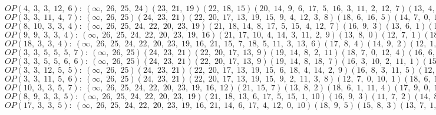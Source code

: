 $OP(4, \;3, \;3, \;12, \;6): \:(\infty, \;26, \;25, \;24)(23, \;21, \;19)(22, \;18, \;15)(20, \;14, \;9, \;6, \;17, \;5, \;16, \;3, \;11, \;2, \;12, \;7)(13, \;4, \;10, \;0, \;8, \;1)$\\
$OP(3, \;3, \;11, \;4, \;7): \:(\infty, \;26, \;25)(24, \;23, \;21)(22, \;20, \;17, \;13, \;19, \;15, \;9, \;4, \;12, \;3, \;8)(18, \;6, \;16, \;5)(14, \;7, \;0, \;11, \;1, \;10, \;2)$\\
$OP(8, \;10, \;3, \;3, \;4): \:(\infty, \;26, \;25, \;24, \;22, \;20, \;23, \;19)(21, \;18, \;14, \;8, \;17, \;5, \;15, \;4, \;12, \;7)(16, \;9, \;3)(13, \;6, \;1)(11, \;2, \;10, \;0)$\\
$OP(9, \;9, \;3, \;3, \;4): \:(\infty, \;26, \;25, \;24, \;22, \;20, \;23, \;19, \;16)(21, \;17, \;10, \;4, \;14, \;3, \;11, \;2, \;9)(13, \;8, \;0)(12, \;7, \;1)(18, \;6, \;15, \;5)$\\
$OP(18, \;3, \;3, \;4): \:(\infty, \;26, \;25, \;24, \;22, \;20, \;23, \;19, \;16, \;21, \;15, \;7, \;18, \;5, \;11, \;3, \;13, \;6)(17, \;8, \;4)(14, \;9, \;2)(12, \;1, \;10, \;0)$\\
$OP(3, \;3, \;5, \;5, \;5, \;7): \:(\infty, \;26, \;25)(24, \;23, \;21)(22, \;20, \;17, \;13, \;9)(19, \;14, \;8, \;2, \;11)(18, \;7, \;0, \;12, \;4)(16, \;6, \;1, \;10, \;3, \;15, \;5)$\\
$OP(3, \;3, \;5, \;5, \;6, \;6): \:(\infty, \;26, \;25)(24, \;23, \;21)(22, \;20, \;17, \;13, \;9)(19, \;14, \;8, \;18, \;7)(16, \;3, \;10, \;2, \;11, \;1)(15, \;6, \;0, \;5, \;12, \;4)$\\
$OP(3, \;3, \;12, \;5, \;5): \:(\infty, \;26, \;25)(24, \;23, \;21)(22, \;20, \;17, \;13, \;19, \;15, \;6, \;18, \;4, \;14, \;2, \;9)(16, \;8, \;3, \;11, \;5)(12, \;7, \;0, \;10, \;1)$\\
$OP(3, \;3, \;11, \;5, \;6): \:(\infty, \;26, \;25)(24, \;23, \;21)(22, \;20, \;17, \;13, \;19, \;15, \;9, \;2, \;11, \;3, \;8)(12, \;7, \;0, \;10, \;1)(18, \;6, \;14, \;4, \;16, \;5)$\\
$OP(10, \;3, \;3, \;5, \;7): \:(\infty, \;26, \;25, \;24, \;22, \;20, \;23, \;19, \;16, \;12)(21, \;15, \;7)(13, \;8, \;2)(18, \;6, \;1, \;11, \;4)(17, \;9, \;0, \;10, \;3, \;14, \;5)$\\
$OP(8, \;9, \;3, \;3, \;5): \:(\infty, \;26, \;25, \;24, \;22, \;20, \;23, \;19)(21, \;18, \;13, \;6, \;17, \;5, \;15, \;1, \;10)(16, \;9, \;3)(11, \;7, \;2)(14, \;8, \;0, \;12, \;4)$\\
$OP(17, \;3, \;3, \;5): \:(\infty, \;26, \;25, \;24, \;22, \;20, \;23, \;19, \;16, \;21, \;14, \;6, \;17, \;4, \;12, \;0, \;10)(18, \;9, \;5)(15, \;8, \;3)(13, \;7, \;1, \;11, \;2)$\\
